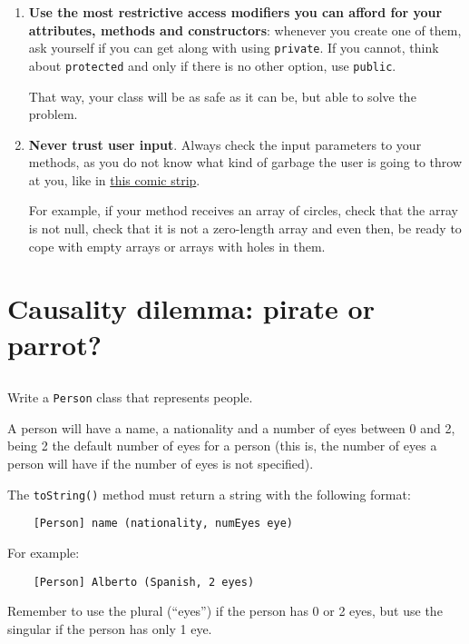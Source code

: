 \documentclass[a4paper, 11pt]{article}
\begin{document}
\begin{enumerate}
  \item \textbf{Use the most restrictive access modifiers you can afford for
    your attributes, methods and constructors}: whenever you create one of
    them, ask yourself if you can get along with using \verb+private+. If you
    cannot, think about \verb+protected+ and only if there is no other option,
    use \verb+public+.

    That way, your class will be as safe as it can be, but able to solve the
    problem.

  \item \textbf{Never trust user input}. Always check the input parameters to
    your methods, as you do not know what kind of garbage the user is going to
    throw at you, like in \href{http://xkcd.com/327/}{this comic
    strip}.

    For example, if your method receives an array of circles, check that the
    array is not null, check that it is not a zero-length array and even then,
    be ready to cope with empty arrays or arrays with holes in them.

\end{enumerate}









\section{Causality dilemma: pirate or parrot?}

\subsection{}

Write a \verb+Person+ class that represents people.

A person will have a name, a nationality and a number of eyes between 0 and 2,
being 2 the default number of eyes for a person (this is, the number of eyes a
person will have if the number of eyes is not specified).

The \verb+toString()+ method must return a string with the following
format:

\verb+    [Person] name (nationality, numEyes eye)+

For example:

\verb+    [Person] Alberto (Spanish, 2 eyes)+

Remember to use the plural (``eyes'') if the person has 0 or 2 eyes, but use
the singular if the person has only 1 eye.
\end{document}
